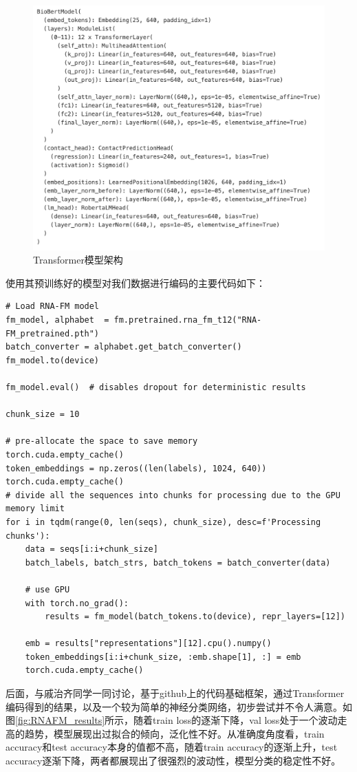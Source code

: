 \documentclass[a4paper,11pt,AutoFakeBold]{ctexart}
\begin{document}
\begin{figure}[h]  
    \centering
    \includegraphics[width=0.8\linewidth]{Figures/model_structure.jpg
    }
        \caption{Transformer模型架构}
        \label{fig:Transformer模型架构}
\end{figure}

使用其预训练好的模型对我们数据进行编码的主要代码如下：

\begin{lstlisting}
# Load RNA-FM model
fm_model, alphabet  = fm.pretrained.rna_fm_t12("RNA-FM_pretrained.pth") 
batch_converter = alphabet.get_batch_converter()
fm_model.to(device)

fm_model.eval()  # disables dropout for deterministic results

chunk_size = 10

# pre-allocate the space to save memory
torch.cuda.empty_cache()
token_embeddings = np.zeros((len(labels), 1024, 640))
torch.cuda.empty_cache()
# divide all the sequences into chunks for processing due to the GPU memory limit
for i in tqdm(range(0, len(seqs), chunk_size), desc=f'Processing chunks'):
    data = seqs[i:i+chunk_size]
    batch_labels, batch_strs, batch_tokens = batch_converter(data)

    # use GPU
    with torch.no_grad():
        results = fm_model(batch_tokens.to(device), repr_layers=[12])

    emb = results["representations"][12].cpu().numpy()
    token_embeddings[i:i+chunk_size, :emb.shape[1], :] = emb
    torch.cuda.empty_cache()
\end{lstlisting}

后面，与戚治齐同学一同讨论，基于github上的代码基础框架，通过Transformer编码得到的结果，以及一个较为简单的神经分类网络，初步尝试并不令人满意。如图\ref{fig:RNAFM_results}所示，随着train loss的逐渐下降，val loss处于一个波动走高的趋势，模型展现出过拟合的倾向，泛化性不好。从准确度角度看，train accuracy和test accuracy本身的值都不高，随着train accuracy的逐渐上升，test accuracy逐渐下降，两者都展现出了很强烈的波动性，模型分类的稳定性不好。
\end{document}
